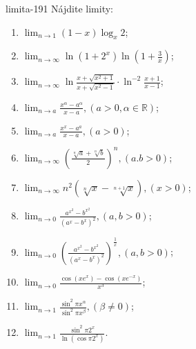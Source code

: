 \begin{defproblem}{limita-191}
Nájdite limity:
\begin{multicols}{2}
\begin{enumerate}
    \item $\lim_{n \rightarrow 1} (1-x)\log_x 2$;
    \item $\lim_{n \rightarrow \infty} \ln (1+2^x) \ln (1+\frac{3}{x})$;
    \item $\lim_{n \rightarrow \infty} \ln \frac{x+\sqrt{x^2+1}}{x+\sqrt{x^2-1}} \cdot \ln ^{-2} \frac{x+1}{x-1}$;
    \item $\lim_{n \rightarrow a} \frac{x^\alpha-a^\alpha}{x-a},(a>0,\alpha \in \mathbb{R})$;
    \item $\lim_{n \rightarrow a} \frac{x^x-a^a}{x-a},(a>0)$;
    \item $\lim_{n \rightarrow \infty} (\frac{\sqrt[n]{a}+\sqrt[n]{b}}{2})^n,(a.b>0)$;
    \item $\lim_{n \rightarrow \infty} n^2(\sqrt[n]{x}-\sqrt[n+1]{x}),(x>0)$;
    \item $\lim_{n \rightarrow 0} \frac{a^{x^2}-b^{x^2}}{(a^x-b^x)^2},(a,b>0)$;
    \item $\lim_{n \rightarrow 0} (\frac{a^{x^2}-b^{x^2}}{(a^x-b^x)^2})^{\frac{1}{x}},(a,b>0)$;
    \item $\lim_{n \rightarrow 0} \frac{\cos (xe^x)-\cos (xe^{-x})}{x^3}$;
    \item $\lim_{n \rightarrow 1} \frac{\sin ^2 \pi x^\alpha}{\sin ^2 \pi x^\beta},(\beta \neq 0)$;
    \item $\lim_{n \rightarrow 1} \frac{\sin ^2 \pi 2^{x}}{\ln (\cos \pi 2^{x})}$.
\end{enumerate}
\end{multicols}
\end{defproblem}

